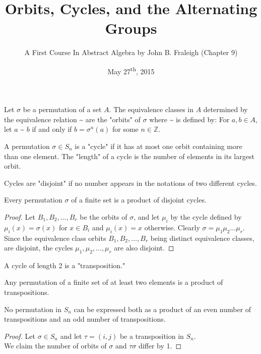 \documentclass[a4paper,11pt]{article}
\title{Orbits, Cycles, and the Alternating Groups}
\author{A First Course In Abstract Algebra by John B. Fraleigh (Chapter 9)}
\date{May 27\textsuperscript{th}, 2015}
\begin{document}
\maketitle
{}

\begin{outline}

    Let \(\sigma\) be a permutation of a set \(A\). The equivalence classes 
    in \(A\) determined by the equivalence relation \textasciitilde{} are the "orbits" of \(\sigma\) where
    \textasciitilde{} is defined by: For \(a, b \in A\), let \(a\) \textasciitilde{} \(b\) if and only 
    if \(b = \sigma^{n}(a)\) for some \(n \in \mathbb{Z}\).
    
    A permutation \(\sigma \in S_{n}\) is a "cycle" if it has at most one orbit containing more than one 
    element. The "length" of a cycle is the number of elements in its largest orbit.
    
    Cycles are "disjoint" if no number appears in the notations of two different
    cycles.
    
    Every permutation \(\sigma\) of a finite set is a product of disjoint cycles.
    
    \begin{proof}
      Let \(B_{1}, B_{2}, \ldots, B_{r}\) be the orbits of \(\sigma\), and let \(\mu_{i}\) 
      by the cycle defined by \(\mu_{i}(x) = \sigma(x)\) for \(x \in B_{i}\) and \(\mu_{i}(x) = x\) otherwise.
      Clearly \(\sigma = \mu_{1}\mu_{2}\ldots\mu_{r}\). Since the equivalence class orbits \(B_{1}, B_{2}, \ldots,
      B_{r}\) being distinct equivalence classes, are disjoint, the cycles \(\mu_{1}, \mu_{2}, \ldots, \mu_{r}\) are
      also disjoint.
    \end{proof}
    
    A cycle of length 2 is a "transposition."
    
    Any permutation of a finite set of at least two elements is a product of transpositions.
    
    No permutation in \(S_{n}\) can be expressed both as a product of an even number of transpositions 
    and an odd number of transpositions.
    
    \begin{proof}
      Let \(\sigma \in S_{n}\) and let \(\tau = (i, j)\) be a transposition in \(S_{n}\).\\
      We claim the number of orbits of \(\sigma\) and \(\tau\sigma\) differ by 1.
      

\end{proof}
\end{outline}
\end{document}
